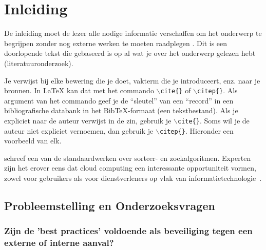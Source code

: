 \documentclass[pdftex,a4paper,12pt]{report}
\begin{document}
\tableofcontents



\chapter{Inleiding}
\label{ch:inleiding}
\newpage

De inleiding moet de lezer alle nodige informatie verschaffen om het onderwerp te begrijpen zonder nog externe werken te moeten raadplegen \citep{Pollefliet2011}. Dit is een doorlopende tekst die gebaseerd is op al wat je over het onderwerp gelezen hebt (literatuuronderzoek). \newline \newline

Je verwijst bij elke bewering die je doet, vakterm die je introduceert, enz. naar je bronnen. In \LaTeX{} kan dat met het commando \texttt{$\backslash${cite\{\}}} of \texttt{$\backslash${citep\{\}}}. Als argument van het commando geef je de ``sleutel'' van een ``record'' in een bibliografische databank in het Bib\TeX{}-formaat (een tekstbestand). Als je expliciet naar de auteur verwijst in de zin, gebruik je \texttt{$\backslash${}cite\{\}}.
Soms wil je de auteur niet expliciet vernoemen, dan gebruik je \texttt{$\backslash${}citep\{\}}. Hieronder een voorbeeld van elk.

\cite{Knuth1998} schreef een van de standaardwerken over sorteer- en zoekalgoritmen. Experten zijn het erover eens dat cloud computing een interessante opportuniteit vormen, zowel voor gebruikers als voor dienstverleners op vlak van informatietechnologie~\citep{Creeger2009}.

\section{Probleemstelling en Onderzoeksvragen}
\label{sec:onderzoeksvragen}

\subsection{Zijn de 'best practices' voldoende als beveiliging tegen een externe of interne aanval?}
\end{document}
